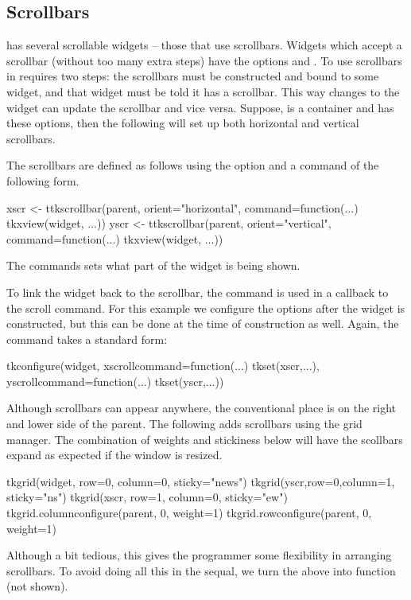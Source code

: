 \subsection{Scrollbars}
\label{sec:tcltk:scrollbars}

\TK\/ has several scrollable widgets -- those that use scrollbars.
Widgets
which accept a scrollbar (without too many extra steps) have the options  and
.  To use scrollbars in  requires two steps: the scrollbars must be constructed and bound
to some widget, and that widget must be told it has a scrollbar. This
way changes to the widget can update the scrollbar and vice
versa. Suppose,  is a container and  has these
options, then the following will set up both horizontal and vertical
scrollbars.

The scrollbars are defined as follows using the  option and a command of the following form.
\begin{Schunk}
\begin{Sinput}
 xscr <- ttkscrollbar(parent, orient="horizontal",
                      command=function(...) tkxview(widget, ...))
 yscr <- ttkscrollbar(parent, orient="vertical",
                      command=function(...) tkxview(widget, ...))
\end{Sinput}
\end{Schunk}
The  commands sets what part of the widget is being shown.

To link the widget back to the scrollbar, the  command is
used in a callback to the scroll command.  For this example we
configure the options after the widget is constructed, but this can be
done at the time of construction as well. Again, the command takes a
standard form:
\begin{Schunk}
\begin{Sinput}
 tkconfigure(widget,
             xscrollcommand=function(...) tkset(xscr,...),
             yscrollcommand=function(...) tkset(yscr,...))
\end{Sinput}
\end{Schunk}

Although scrollbars can appear anywhere, the conventional place is on the right and lower side of the parent. The following adds scrollbars using the grid manager. The combination of weights and stickiness below will have the scollbars expand as expected if the window is resized. 
\begin{Schunk}
\begin{Sinput}
 tkgrid(widget, row=0, column=0, sticky="news")
 tkgrid(yscr,row=0,column=1, sticky="ns")
 tkgrid(xscr, row=1, column=0, sticky="ew")
 tkgrid.columnconfigure(parent, 0, weight=1)
 tkgrid.rowconfigure(parent, 0, weight=1)
\end{Sinput}
\end{Schunk}
Although a bit tedious, this gives the programmer some flexibility in arranging scrollbars. To avoid doing all this in the sequal, we turn the above into function  (not shown).


